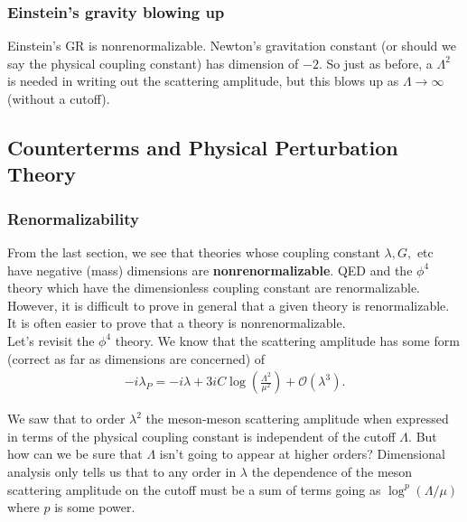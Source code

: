 \documentclass{book}
\theoremstyle{definition}
\newcommand{\f}[2]{\frac{#1}{#2}}
\newcommand{\lp}{\left(}
\newcommand{\rp}{\right)}
\begin{document}
\subsubsection{Einstein's gravity blowing up}


Einstein's GR is nonrenormalizable. Newton's gravitation constant (or should we say the physical coupling constant) has dimension of $-2$. So just as before, a $\Lambda^2$ is needed in writing out the scattering amplitude, but this blows up as $\Lambda \to \infty$ (without a cutoff). 












\newpage

\subsection{Counterterms and Physical Perturbation Theory}




\subsubsection{Renormalizability}


From the last section, we see that theories whose coupling constant $\lambda, G,$ etc have negative (mass) dimensions are \textbf{nonrenormalizable}. QED and the $\phi^4$ theory which have the dimensionless coupling constant are renormalizable. However, it is difficult to prove in general that a given theory is renormalizable. It is often easier to prove that a theory is nonrenormalizable. \\


Let's revisit the $\phi^4$ theory. We know that the scattering amplitude has some form (correct as far as dimensions are concerned) of
\begin{align}
-i\lambda_P = -i\lambda + 3iC \log \lp \f{\Lambda^2}{\mu^2} \rp + \mathcal{O}(\lambda^3).
\end{align}


We saw that to order $\lambda^2$ the meson-meson scattering amplitude when expressed in terms of the physical coupling constant is independent of the cutoff $\Lambda$. But how can we be sure that $\Lambda$ isn't going to appear at higher orders? Dimensional analysis only tells us that to any order in $\lambda$ the dependence of the meson scattering amplitude on the cutoff must be a sum of terms going as $\log^p(\Lambda/\mu)$ where $p$ is some power. \\
\end{document}
